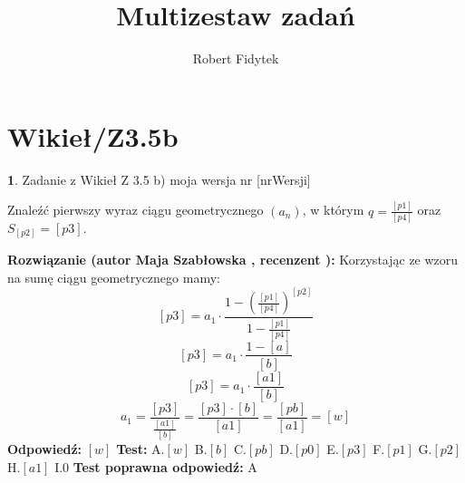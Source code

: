 \documentclass[12pt, a4paper]{article}
\title{Multizestaw zadań}
\author{Robert Fidytek}
\date{}
\theoremstyle{definition} %
\newtheorem{zad}{}
\newcommand{\kategoria}[1]{\section{#1}} %
\newcommand{\zadStart}[1]{\begin{zad}#1\newline} %
\newcommand{\zadStop}{\end{zad}}   %
\newcommand{\rozwStart}[2]{\noindent \textbf{Rozwiązanie (autor #1 , recenzent #2): }\newline} %
\newcommand{\rozwStop}{\newline}                                            %
\newcommand{\odpStart}{\noindent \textbf{Odpowiedź:}\newline}    %
\newcommand{\odpStop}{\newline}                                             %
\newcommand{\testStart}{\noindent \textbf{Test:}\newline} %
\newcommand{\testStop}{\newline} %
\newcommand{\kluczStart}{\noindent \textbf{Test poprawna odpowiedź:}\newline} %
\newcommand{\kluczStop}{\newline} %
\begin{document}
\maketitle


\kategoria{Wikieł/Z3.5b}
\zadStart{Zadanie z Wikieł Z 3.5 b)  moja wersja nr [nrWersji]}


Znaleźć pierwszy wyraz ciągu geometrycznego $(a_{n})$, w którym $q=\frac{[p1]}{[p4]}$ oraz $S_{[p2]}=[p3].$
\zadStop
\rozwStart{Maja Szabłowska}{}
Korzystając ze wzoru na sumę ciągu geometrycznego mamy:
$$ [p3]=a_{1}\cdot \frac{1-(\frac{[p1]}{[p4]})^{[p2]}}{1-\frac{[p1]}{[p4]}}$$
$$ [p3]=a_{1}\cdot \frac{1-[a]}{[b]}$$
$$ [p3]=a_{1}\cdot \frac{[a1]}{[b]}$$
$$ a_{1}=\frac{[p3]}{\frac{[a1]}{[b]}}=\frac{[p3]\cdot[b]}{[a1]}=\frac{[pb]}{[a1]}=[w]$$
\rozwStop
\odpStart
$[w]$
\odpStop
\testStart
A.$[w]$
B.$[b]$
C.$[pb]$
D.$[p0]$
E.$[p3]$
F.$[p1]$
G.$[p2]$
H.$[a1]$
I.$0$
\testStop
\kluczStart
A
\kluczStop
\end{document}
